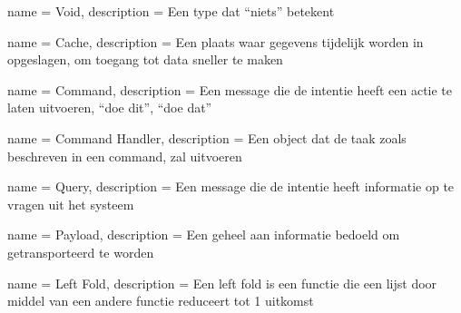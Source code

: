 {
  name = Void,
  description = {Een type dat ``niets'' betekent}
}

{
  name = Cache,
  description = {Een plaats waar gegevens tijdelijk worden in opgeslagen, om toegang tot data sneller te maken}
}

{
  name = Command,
  description = {Een message die de intentie heeft een actie te laten uitvoeren, ``doe dit'', ``doe dat''}
}

{
  name = {Command Handler},
  description = {Een object dat de taak zoals beschreven in een command, zal uitvoeren}
}

{
  name = Query,
  description = {Een message die de intentie heeft informatie op te vragen uit het systeem}
}

{
  name = Payload,
  description = {Een geheel aan informatie bedoeld om getransporteerd te worden}
}

{
  name = {Left Fold},
  description = {Een left fold is een functie die een lijst door middel van een andere functie reduceert tot 1 uitkomst}
}


\printglossary[type=\acronymtype,title={Lijst van acroniemen}]

\printglossary
{}
